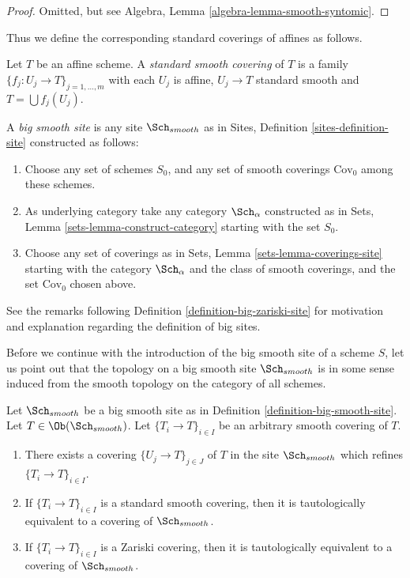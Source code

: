 \begin{proof}
Omitted, but see Algebra, Lemma \ref{algebra-lemma-smooth-syntomic}.
\end{proof}

\noindent
Thus we define the corresponding standard coverings of affines as follows.

\begin{definition}
\label{definition-standard-smooth}
Let $T$ be an affine scheme. A {\it standard smooth covering}
of $T$ is a family $\{f_j : U_j \to T\}_{j = 1, \ldots, m}$
with each $U_j$ is affine, $U_j \to T$ standard smooth
and $T = \bigcup f_j(U_j)$.
\end{definition}

\begin{definition}
\label{definition-big-smooth-site}
A {\it big smooth site} is any site $\Sch_{smooth}$ as in
Sites, Definition \ref{sites-definition-site} constructed as follows:
\begin{enumerate}
\item Choose any set of schemes $S_0$, and any set of smooth coverings
$\text{Cov}_0$ among these schemes.
\item As underlying category take any category $\Sch_\alpha$
constructed as in Sets, Lemma \ref{sets-lemma-construct-category}
starting with the set $S_0$.
\item Choose any set of coverings as in
Sets, Lemma \ref{sets-lemma-coverings-site} starting with the
category $\Sch_\alpha$ and the class of smooth coverings,
and the set $\text{Cov}_0$ chosen above.
\end{enumerate}
\end{definition}

\noindent
See the remarks following Definition \ref{definition-big-zariski-site}
for motivation and explanation regarding the definition of big sites.

\medskip\noindent
Before we continue with the introduction of the big smooth site of
a scheme $S$, let us point out that the topology on a big smooth site
$\Sch_{smooth}$ is in some sense induced from the smooth topology
on the category of all schemes.

\begin{lemma}
\label{lemma-smooth-induced}
Let $\Sch_{smooth}$ be a big smooth site as in
Definition \ref{definition-big-smooth-site}.
Let $T \in \Ob(\Sch_{smooth})$.
Let $\{T_i \to T\}_{i \in I}$ be an arbitrary smooth covering of $T$.
\begin{enumerate}
\item There exists a covering $\{U_j \to T\}_{j \in J}$ of $T$ in the site
$\Sch_{smooth}$ which refines $\{T_i \to T\}_{i \in I}$.
\item If $\{T_i \to T\}_{i \in I}$ is a standard smooth covering, then
it is tautologically equivalent to a covering of $\Sch_{smooth}$.
\item If $\{T_i \to T\}_{i \in I}$ is a Zariski covering, then
it is tautologically equivalent to a covering of $\Sch_{smooth}$.
\end{enumerate}
\end{lemma}

